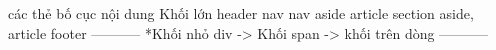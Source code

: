 các thẻ bố cục nội dung 
Khối lớn
header 
    nav
nav
aside 
article
section
    aside, article
footer
-----------
*Khối nhỏ 
    div -> Khối
    span -> khối trên dòng
-----------



